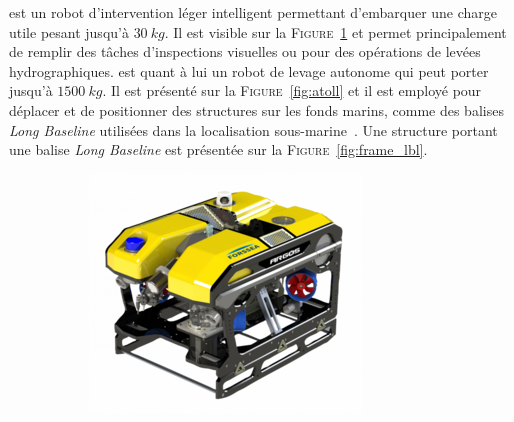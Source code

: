 			\argos{} est un robot d'intervention léger intelligent permettant d'embarquer une charge utile pesant jusqu'à $30\ kg$. Il est visible sur la \textsc{Figure}~\ref{fig:argos} et permet principalement de remplir des tâches d'inspections visuelles ou pour des opérations de levées hydrographiques. \atoll{} est quant à lui un robot de levage autonome qui peut porter jusqu'à $1500\ kg$. Il est présenté sur la \textsc{Figure}~\ref{fig:atoll} et il est employé pour déplacer et de positionner des structures sur les fonds marins, comme des balises \textit{Long Baseline} utilisées dans la localisation sous-marine~\cite{milne1983underwater}. Une structure portant une balise \textit{Long Baseline} est présentée sur la \textsc{Figure}~\ref{fig:frame_lbl}.

			\begin{figure}[!htb]
				\centering
				\begin{subfigure}[t]{0.3\textwidth}
					\centering
					\includegraphics[width=\textwidth]{imgs/argos.png}
					\caption{\argos{}}
					\label{fig:argos}
				\end{subfigure}
				\hfill
				\begin{subfigure}[t]{0.3\textwidth}
					\centering

\end{subfigure}
\end{figure}
